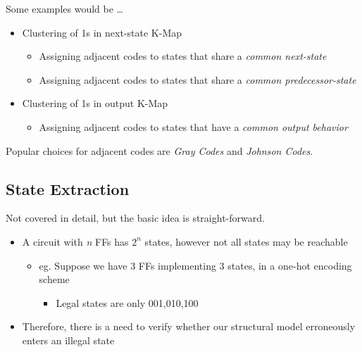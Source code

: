 \documentclass{article}
\begin{document}
Some examples would be \dots
\begin{itemize}
    \item Clustering of 1s in next-state K-Map
        \begin{itemize}
            \item Assigning adjacent codes to states that share a \textit{common next-state}
            \item Assigning adjacent codes to states that share a \textit{common predecessor-state}
        \end{itemize}
    \item Clustering of 1s in output K-Map
        \begin{itemize}
            \item Assigning adjacent codes to states that have a \textit{common output behavior}
        \end{itemize}
\end{itemize}


Popular choices for adjacent codes are \textit{Gray Codes} and \textit{Johnson Codes}.

\subsection{State Extraction}
Not covered in detail, but the basic idea is straight-forward.

\begin{itemize}
    \item A circuit with \textit{n} FFs has $2^{n}$ states, however not all states may be reachable
        \begin{itemize}
            \item eg. Suppose we have 3 FFs implementing 3 states, in a one-hot encoding scheme
                \begin{itemize}
                    \item Legal states are only 001,010,100
                \end{itemize}
        \end{itemize}
    \item Therefore, there is a need to verify whether our structural model erroneously enters an illegal state
\end{itemize}
\end{document}
